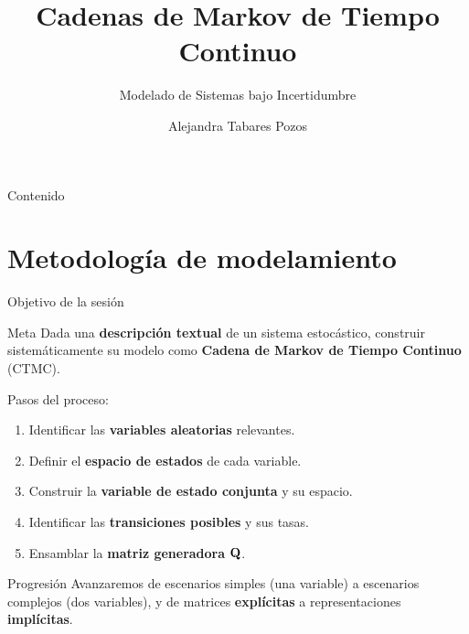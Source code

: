 \documentclass[aspectratio=1610, 9pt]{beamer}
\title[CTMC -- Modelamiento]{Cadenas de Markov de Tiempo Continuo}
\subtitle{Modelado de Sistemas bajo Incertidumbre}
\author{Alejandra Tabares Pozos}
\institute{Universidad de los Andes \\
 Departamento de Ingeniería Industrial}
\date{}
\begin{document}
\begin{frame}[plain]
\titlepage
\end{frame}

\begin{frame}{Contenido}
\tableofcontents
\end{frame}

\section{Metodolog\'ia de modelamiento}

\begin{frame}{Objetivo de la sesi\'on}
\begin{block}{Meta}
Dada una \textbf{descripci\'on textual} de un sistema estoc\'astico, construir sistem\'aticamente su modelo como \textbf{Cadena de Markov de Tiempo Continuo} (CTMC).
\end{block}
\vspace{6pt}

Pasos del proceso:
\begin{enumerate}
    \item Identificar las \textbf{variables aleatorias} relevantes.
    \item Definir el \textbf{espacio de estados} de cada variable.
    \item Construir la \textbf{variable de estado conjunta} y su espacio.
    \item Identificar las \textbf{transiciones posibles} y sus tasas.
    \item Ensamblar la \textbf{matriz generadora} $\mathbf{Q}$.
\end{enumerate}

\vspace{6pt}
\begin{alertblock}{Progresión}
Avanzaremos de escenarios simples (una variable) a escenarios complejos (dos variables), y de matrices \textbf{expl\'icitas} a representaciones \textbf{impl\'icitas}.
\end{alertblock}
\end{frame}
\end{document}
